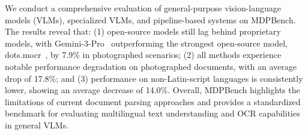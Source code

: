 \documentclass[runningheads]{llncs}
\begin{document}
\begin{table}[t]
\centering
\caption{Comparison of document parsing benchmarks.\textbf{DB}: Digital-Born; \textbf{Photo.}: Photographed; \textbf{SR}: Screen Re-photograph; \textbf{PD}: Physical Deformation; \textbf{ID}: Image Degradation; \textbf{CO}: Camera Orientations; \textbf{BV}: Background Variation.}
\label{tab:benchmark_final_pro}
\small
\setlength{\tabcolsep}{3.5pt}
\renewcommand{\arraystretch}{1.2}
\vspace{1ex}
\raggedright
\end{table}

We conduct a comprehensive evaluation of general-purpose vision-language models (VLMs), specialized VLMs, and pipeline-based systems on MDPBench. The results reveal that: (1) open-source models still lag behind proprietary models, with Gemini-3-Pro~\cite{gemini3pro} outperforming the strongest open-source model, dots.mocr~\cite{dotsmocr}, by 7.9\% in photographed scenarios; (2) all methods experience notable performance degradation on photographed documents, with an average drop of 17.8\%; and (3) performance on non-Latin-script languages is consistently lower, showing an average decrease of 14.0\%. Overall, MDPBench highlights the limitations of current document parsing approaches and provides a standardized benchmark for evaluating multilingual text understanding and OCR capabilities in general VLMs.
\end{document}
